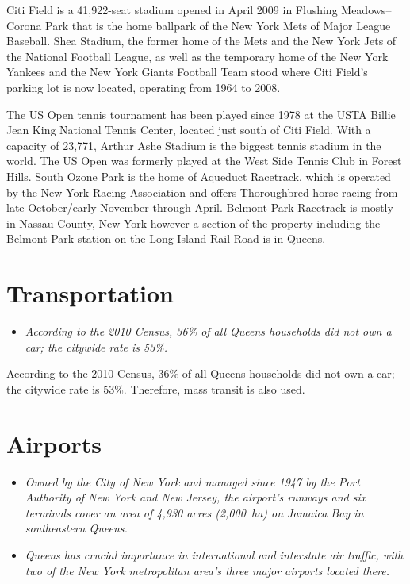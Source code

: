 Citi Field is a 41,922-seat stadium opened in April 2009 in Flushing
Meadows--Corona Park that is the home ballpark of the New York Mets of
Major League Baseball. Shea Stadium, the former home of the Mets and the
New York Jets of the National Football League, as well as the temporary
home of the New York Yankees and the New York Giants Football Team stood
where Citi Field's parking lot is now located, operating from 1964 to
2008.

The US Open tennis tournament has been played since 1978 at the USTA
Billie Jean King National Tennis Center, located just south of Citi
Field. With a capacity of 23,771, Arthur Ashe Stadium is the biggest
tennis stadium in the world. The US Open was formerly played at the West
Side Tennis Club in Forest Hills. South Ozone Park is the home of
Aqueduct Racetrack, which is operated by the New York Racing Association
and offers Thoroughbred horse-racing from late October/early November
through April. Belmont Park Racetrack is mostly in Nassau County, New
York however a section of the property including the Belmont Park
station on the Long Island Rail Road is in Queens.

\section{Transportation}\label{transportation}

\begin{itemize}
\item
  \emph{According to the 2010 Census, 36\% of all Queens households did
  not own a car; the citywide rate is 53\%.}
\end{itemize}

According to the 2010 Census, 36\% of all Queens households did not own
a car; the citywide rate is 53\%. Therefore, mass transit is also used.

\section{Airports}\label{airports}

\begin{itemize}
\item
  \emph{Owned by the City of New York and managed since 1947 by the Port
  Authority of New York and New Jersey, the airport's runways and six
  terminals cover an area of 4,930 acres (2,000~ha) on Jamaica Bay in
  southeastern Queens.}
\item
  \emph{Queens has crucial importance in international and interstate
  air traffic, with two of the New York metropolitan area's three major
  airports located there.}
\end{itemize}

